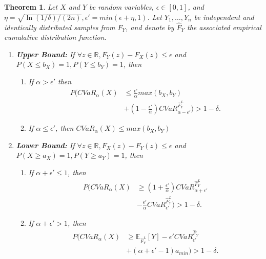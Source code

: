 \documentclass[letterpaper]{article} %
\newtheorem{theorem}{Theorem}[section]
\begin{document}
\begin{theorem}
	\label{thm:ecdf_y_bound_cvar_x}
	Let $X$ and $Y$ be random variables, $\epsilon \in [0, 1]$, and $\eta = \sqrt{\ln(1/\delta)/(2n)}, \epsilon'=min(\epsilon+\eta, 1)$. Let $Y_1, \dots, Y_n$ be independent and identically distributed samples from $F_Y$, and denote by $\hat{F}_Y$ the associated empirical cumulative distribution function.
	\begin{enumerate}
		\item \textbf{Upper Bound:} If $\forall z\in \mathbb{R},F_Y(z)-F_X(z)\leq \epsilon$ and $P(X\leq b_X)=1, P(Y\leq b_Y)=1$, then
		
		\begin{enumerate}
			\item If $\alpha > \epsilon'$ then \begin{equation}\label{eq:general_cvar_upper_bound_1}
				\begin{aligned}
					P\Big(CVaR_\alpha(X) &\leq \frac{\epsilon'}{\alpha}max(b_X,b_Y) \\
					&+ (1 - \frac{\epsilon'}{\alpha})CVaR_{\alpha-\epsilon'}^{\hat{F}_Y^L}\Big)>1-\delta.
				\end{aligned}
			\end{equation}
			
			\item If $\alpha \leq \epsilon'$, then $CVaR_\alpha(X)\leq max(b_X,b_Y)$
		\end{enumerate}
		
		\item \textbf{Lower Bound:} If $\forall z\in \mathbb{R},F_X(z)-F_Y(z)\leq \epsilon$ and $P(X\geq a_X)=1,P(Y\geq a_Y)=1$, then \begin{enumerate}
			\item If $\alpha+\epsilon' \leq 1$, then \begin{equation}\label{eq:general_cvar_lower_bound_1}
				\begin{aligned}
					P\Big(CVaR_{\alpha}(X)&\geq (1+\frac{\epsilon'}{\alpha})CVaR_{\alpha+\epsilon'}^{\hat{F}_Y^L} \\
					&-\frac{\epsilon'}{\alpha} CVaR_{\epsilon'}^{\hat{F}_Y^L}\Big)>1-\delta.
				\end{aligned}
			\end{equation}
			
			\item If $\alpha+\epsilon' > 1$, then \begin{equation}
				\begin{aligned}
					P\Big(CVaR_\alpha(X) &\geq \mathbb{E}_{\hat{F}_Y^L}[Y] - \epsilon' CVaR_{\epsilon'}^{\hat{F}_Y} \\
					&+ (\alpha+\epsilon'-1)a_{min} \Big) > 1-\delta.
				\end{aligned}
			\end{equation}
		\end{enumerate}
	\end{enumerate}
\end{theorem}
\end{document}
